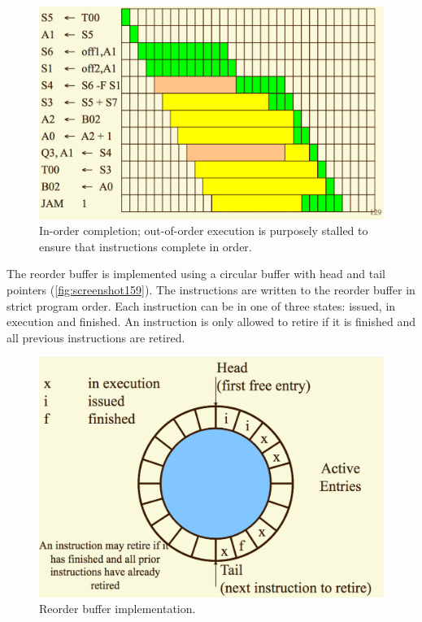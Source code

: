 \begin{figure}
\centering
\includegraphics[width=0.7\linewidth]{figures/screenshot158}
\caption[In-order completion.]{In-order completion; out-of-order execution is purposely stalled to ensure that instructions complete in order.}
\label{fig:screenshot158}
\end{figure}

The reorder buffer is implemented using a circular buffer with head and tail pointers (\autoref{fig:screenshot159}). The instructions are written to the reorder buffer in strict program order. Each instruction can be in one of three states: issued, in execution and finished. An instruction is only allowed to retire if it is finished and all previous instructions are retired.

\begin{figure}
\centering
\includegraphics[width=0.7\linewidth]{figures/screenshot159}
\caption{Reorder buffer implementation.}
\label{fig:screenshot159}
\end{figure}


